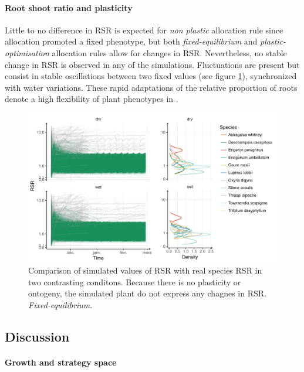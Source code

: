 
\paragraph{Root shoot ratio and plasticity}

Little to no difference in RSR is expected for \textit{non plastic} allocation rule since allocation promoted a fixed phenotype, but both \textit{fixed-equilibrium} and \textit{plastic-optimisation} allocation rules allow for changes in RSR. Nevertheless, no stable change in RSR is observed in any of the simulations. Fluctuations are present but consist in stable oscillations between two fixed values (see figure \ref{fig:comparison_RSR}), synchronized with water variations. These rapid adaptations of the relative proportion of roots denote a high flexibility of plant phenotypes in \model.


\begin{figure}\label{fig:comparison_RSR}
\includegraphics[width = \textwidth]{./2_PP/Figures/Calibration/RSR_full_sim_f-e.pdf}
\caption{Comparison of simulated values of RSR with real species RSR in two contrasting conditons. Because there is no plasticity or ontogeny, the simulated plant do not express any chagnes in RSR. \textit{Fixed-equilibrium}.}
\end{figure}


\vspace{2cm}

\subsection{Discussion}

\paragraph{Growth and strategy space}

